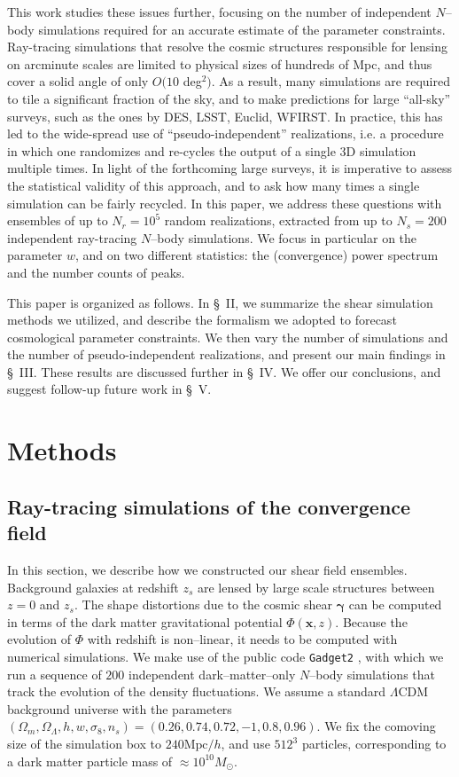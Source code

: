 \documentclass[reprint,aps,prd,superscriptaddress,showkeys,showpacs]{revtex4-1}
\newcommand{\bb}[1]{\mathbf{#1}}
\begin{document}
This work studies these issues further, focusing on the number of
independent $N$--body simulations required for an accurate estimate of
the parameter constraints.  Ray-tracing simulations that resolve the
cosmic structures responsible for lensing on arcminute scales are
limited to physical sizes of hundreds of Mpc, and thus cover a solid
angle of only $O(10$ deg$^2)$.  As a result, many simulations are
required to tile a significant fraction of the sky, and to make
predictions for large ``all-sky'' surveys, such as the ones by DES,
LSST, Euclid, WFIRST.  In practice, this has led to the wide-spread
use of ``pseudo-independent'' realizations, i.e. a procedure in which
one randomizes and re-cycles the output of a single 3D simulation
multiple times.  In light of the forthcoming large surveys, it is
imperative to assess the statistical validity of this approach, and to
ask how many times a single simulation can be fairly recycled.  In
this paper, we address these questions with ensembles of up to
$N_r=10^5$ random realizations, extracted from up to $N_s=200$
independent ray-tracing $N$--body simulations. We focus in particular on
the parameter $w$, and on two different statistics: the (convergence)
power spectrum and the number counts of peaks.


This paper is organized as follows.  In \S~II, we summarize the shear
simulation methods we utilized, and describe the formalism we adopted
to forecast cosmological parameter constraints. We then vary the
number of simulations and the number of pseudo-independent
realizations, and present our main findings in \S~III. These results
are discussed further in \S~IV.  We offer our conclusions, and suggest
follow-up future work in \S~V.


\section{Methods}

\subsection{Ray-tracing simulations of the convergence field}
\label{shearsim}
%
In this section, we describe how we constructed our shear field
ensembles. Background galaxies at redshift $z_s$ are lensed by large
scale structures between $z=0$ and $z_s$. The shape distortions due to
the cosmic shear $\pmb{\gamma}$ can be computed in terms of the dark
matter gravitational potential $\Phi(\bb{x},z)$. Because the evolution
of $\Phi$ with redshift is non--linear, it needs to be computed with
numerical simulations. We make use of the public code \texttt{Gadget2}
\citep{Gadget2}, with which we run a sequence of $200$ independent
dark--matter--only $N$--body simulations that track the evolution of
the density fluctuations. We assume a standard $\Lambda$CDM background
universe with the parameters
$(\Omega_m,\Omega_\Lambda,h,w,\sigma_8,n_s)=(0.26,0.74,0.72,-1,0.8,0.96)$.
We fix the comoving size of the simulation box to $240\mathrm{Mpc}/h$,
and use $512^3$ particles, corresponding to a dark matter particle
mass of $\approx 10^{10}M_\odot$.
\end{document}
